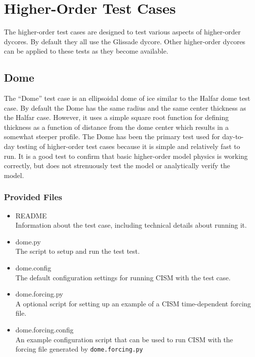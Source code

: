 
\section{Higher-Order Test Cases}
\label{sc:ho-tests}

The higher-order test cases are designed to test various aspects of higher-order dycores.
By default they all use the Glissade dycore.  Other higher-order dycores can be applied
to these tests as they become available.

\subsection{Dome}
The ``Dome'' test case is an ellipsoidal dome of ice similar to the Halfar dome test case.
By default the Dome has the same radius and the same center thickness as the Halfar case.
However, it uses a simple square root function for defining thickness as a function 
of distance from the dome center which results in a somewhat steeper profile.  
The Dome has been the primary test used for day-to-day testing of higher-order
test cases because it is simple and relatively fast to run.  It is a good test
to confirm that basic higher-order model physics is working correctly, but does
not strenuously test the model or analytically verify the model.

\subsubsection{Provided Files}

\begin{itemize}
	\item README \\
		Information about the test case, including technical details about running it.
	\item dome.py \\
		The script to setup and run the test test.
  \item dome.config \\
  The default configuration settings for running CISM with the test case.
	\item dome.forcing.py \\
		A optional script for setting up an example of a CISM time-dependent forcing file.
  \item dome.forcing.config \\
  An example configuration script that can be used to run CISM with the forcing file
  generated by \texttt{dome.forcing.py}
\end{itemize}

